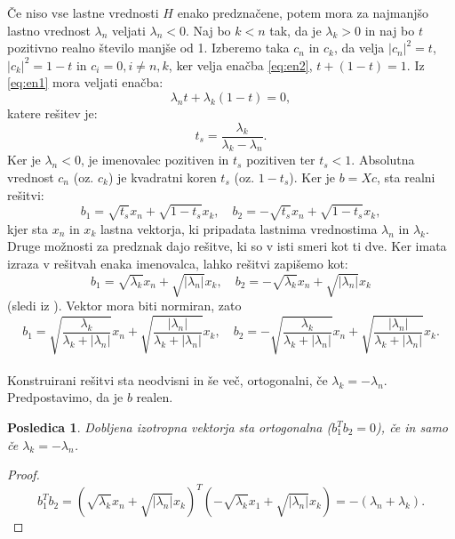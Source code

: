\documentclass[12pt,a4paper]{amsart}
\theoremstyle{definition}
\theoremstyle{plain}
\newtheorem{posledica}[definicija]{Posledica}
\newcommand{\abs}[1]{ \left\lvert#1\right\rvert}
\begin{document}
Če niso vse lastne vrednosti $H$ enako predznačene, potem mora za najmanjšo lastno vrednost $\lambda_n$ veljati $\lambda_n <0$. 
Naj bo $k<n$ tak, da je $\lambda_k >0$ in naj bo $t$ pozitivno realno število manjše od 1.  Izberemo taka $c_n$ in $c_k$, da velja  $\abs{c_n}^2 =t$, $\abs{c_k}^2=1-t$ in $c_i =0, i\not=n,k$, ker velja enačba \eqref{eq:en2}, $t+ (1-t)=1$. Iz \eqref{eq:en1} mora veljati enačba: $$\lambda_n t +\lambda_k (1-t)=0,$$ katere rešitev je:
\begin{equation}
t_s=\frac{\lambda_k}{\lambda_k -\lambda_n}.
\end{equation}
Ker je $\lambda_n <0$, je imenovalec pozitiven in $t_s$ pozitiven ter $t_s <1$. Absolutna vrednost $c_n$ (oz. $c_k$) je kvadratni koren $t_s$ (oz. $1-t_s$). Ker je $b=Xc$, sta realni rešitvi: $$b_1=\sqrt{t_s}x_n +\sqrt{1-t_s}x_k,\quad b_2=-\sqrt{t_s}x_n+\sqrt{1-t_s}x_k,$$ kjer sta $x_n$ in $x_k$ lastna vektorja, ki pripadata lastnima vrednostima $\lambda_n$ in $\lambda_k$. Druge možnosti za predznak dajo rešitve, ki so v isti smeri kot ti dve. Ker imata izraza v rešitvah enaka imenovalca, lahko rešitvi zapišemo kot: $$b_1=\sqrt{\lambda_k}x_n+\sqrt{\abs{\lambda_n}}x_k, \quad b_2=-\sqrt{\lambda_k}x_n+\sqrt{\abs{\lambda_n}}x_k$$(sledi iz \cite{lipkin}).  Vektor mora biti normiran, zato
 $$b_1=\sqrt{\frac{\lambda_k}{\lambda_k +\abs{\lambda_n}}}x_n + \sqrt{\frac{\abs{\lambda_n}}{\lambda_k +\abs{\lambda_n}}}x_k,\quad b_2=-\sqrt{\frac{\lambda_k}{\lambda_k +\abs{\lambda_n}}}x_n + \sqrt{\frac{\abs{\lambda_n}}{\lambda_k +\abs{\lambda_n}}}x_k.$$ \\%
 Konstruirani rešitvi sta neodvisni in še več, ortogonalni, če $\lambda_k =-\lambda_n$. \\
Predpostavimo, da je $b$ realen.
\begin{posledica}\cite{lipkin}
Dobljena izotropna vektorja sta ortogonalna ($b_1 ^T b_2=0$), če in samo če $\lambda_k=-\lambda_n$.
\end{posledica}
\begin{proof}%
$$b_1 ^T b_2=(\sqrt{\lambda_k}x_n+\sqrt{\abs{\lambda_n}}x_k)^T (-\sqrt{\lambda_k}x_1+\sqrt{\abs{\lambda_n}}x_k )= -(\lambda_n +\lambda_k).$$
\end{proof}
\end{document}
